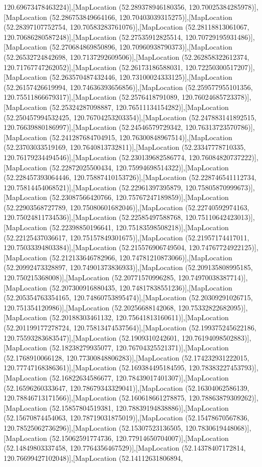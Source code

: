 120.69673478463224)],[MapLocation (52.289378946180356, 120.70025384285978)],[MapLocation (52.286753849664166, 120.70403039315275)],[MapLocation (52.28397107752754, 120.70583283761076)],[MapLocation (52.28118813061067, 120.70686280587248)],[MapLocation (52.27535912825514, 120.70729195931486)],[MapLocation (52.270684869850896, 120.70960938790373)],[MapLocation (52.26532724842698, 120.7137292609506)],[MapLocation (52.262858322612374, 120.71767747262052)],[MapLocation (52.26173186588031, 120.72250300517207)],[MapLocation (52.263570487432446, 120.73100024333125)],[MapLocation (52.26157426619994, 120.74636393656856)],[MapLocation (52.259577955101356, 120.75511866679317)],[MapLocation (52.2576418791089, 120.76024685723378)],[MapLocation (52.25324287098887, 120.76511134154282)],[MapLocation (52.250457994532425, 120.76704253203354)],[MapLocation (52.247883141892515, 120.76639880186997)],[MapLocation (52.24546579729342, 120.76313723570786)],[MapLocation (52.241287684704915, 120.76300848967514)],[MapLocation (52.23703033519169, 120.7640813732811)],[MapLocation (52.23347778710335, 120.76179234494546)],[MapLocation (52.230139682586774, 120.76084820737222)],[MapLocation (52.22872025500434, 120.75994698514322)],[MapLocation (52.228457393064446, 120.75887410153726)],[MapLocation (52.228746541112734, 120.75814454068521)],[MapLocation (52.22961397395879, 120.75805870999673)],[MapLocation (52.23087566420766, 120.75767247189859)],[MapLocation (52.22903568727789, 120.75080601682046)],[MapLocation (52.22740592974163, 120.75024811734536)],[MapLocation (52.22585497588768, 120.75110642423013)],[MapLocation (52.22398850196641, 120.75183598508218)],[MapLocation (52.22125437036617, 120.75157849301675)],[MapLocation (52.21957174417011, 120.75033394803384)],[MapLocation (52.215576906749504, 120.74767724922125)],[MapLocation (52.212133646782966, 120.74781210873066)],[MapLocation (52.20992473328897, 120.74901373836933)],[MapLocation (52.209135808995185, 120.750215368008)],[MapLocation (52.20771570996285, 120.74970038387714)],[MapLocation (52.207300916880435, 120.74817838551236)],[MapLocation (52.205354763354165, 120.74860753895474)],[MapLocation (52.20309291026715, 120.751354120986)],[MapLocation (52.20256688142068, 120.75332822682095)],[MapLocation (52.20188303461132, 120.75641813160611)],[MapLocation (52.201199177278724, 120.75813474537564)],[MapLocation (52.199375245622186, 120.75593283683547)],[MapLocation (52.1909310242601, 120.76194098502883)],[MapLocation (52.18238279935077, 120.76704325521371)],[MapLocation (52.1768910066128, 120.77300848806283)],[MapLocation (52.174232931222015, 120.77747168386361)],[MapLocation (52.169384495184595, 120.78383227453793)],[MapLocation (52.16822634586677, 120.78439017401307)],[MapLocation (52.16596260333647, 120.78679343329041)],[MapLocation (52.16304062586139, 120.78846713171566)],[MapLocation (52.160618661278875, 120.78863879309262)],[MapLocation (52.15857804519381, 120.78839194838886)],[MapLocation (52.15670874454063, 120.78719031875019)],[MapLocation (52.15478670567836, 120.78525062736296)],[MapLocation (52.15307523136505, 120.7830619448068)],[MapLocation (52.15062591774736, 120.77914650704007)],[MapLocation (52.14849803337458, 120.7764356467529)],[MapLocation (52.14378407172814, 120.76699427102048)],[MapLocation (52.14112631806894, 